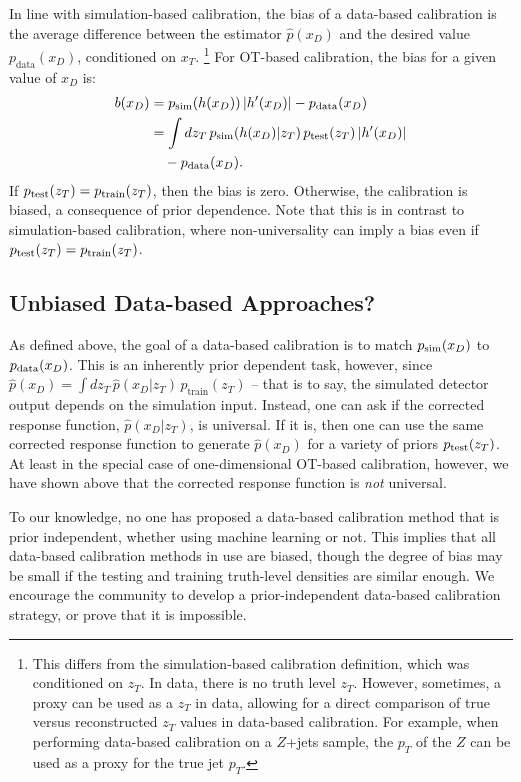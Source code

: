 \documentclass[aps,prd,reprint,preprintnumbers,superscriptaddress,nofootinbib,longbibliography,floatfix]{revtex4-1}
\begin{document}
In line with simulation-based calibration, the bias of a data-based calibration is the average difference between the estimator $\hat{p}(x_D)$ and the desired value $p_{\text{data}}(x_D)$, conditioned on $x_T$.%
%
\footnote{This differs from the simulation-based calibration definition, which was conditioned on $z_T$. In data, there is no truth level $z_T$. However, sometimes, a proxy can be used as a $z_T$ in data, allowing for a direct comparison of true versus reconstructed $z_T$ values in data-based calibration. For example, when performing data-based calibration on a $Z$+jets sample, the $p_T$ of the $Z$ can be used as a proxy for the true jet $p_T$.}
%
For OT-based calibration, the bias for a given value of $x_D$ is:
%
\begin{align}
    b(x_D) &= p_{\rm sim}(h(x_D))\,|h'(x_D)| - p_{\rm data}(x_D) \\
           &= \int dz_T\, p_{\rm sim}(h(x_D)|z_T)\,p_{\rm test}(z_T)\,|h'(x_D)| \nonumber \\ &\quad - p_{\rm data}(x_D) \nonumber.
\end{align}
%
If $p_{\rm test}(z_T) = p_{\rm train}(z_T)$, then the bias is zero. 
%
Otherwise, the calibration is biased, a consequence of prior dependence. 
%
Note that this is in contrast to simulation-based calibration, where non-universality can imply a bias even if $p_{\rm test}(z_T) = p_{\rm train}(z_T)$. 

\subsection{Unbiased Data-based Approaches?}
\label{sec:data_based_prior}

As defined above, the goal of a data-based calibration is to match $p_{\rm sim}(x_D)$ to $p_{\rm data}(x_D)$.
%
This is an inherently prior dependent task, however, since $\hat{p}(x_D) = \int dz_T\, \hat{p}(x_D|z_T)\,p_{\text{train}}(z_T)$ -- that is to say, the simulated detector output depends on the simulation input.
%
Instead, one can ask if the corrected response function, $\hat{p}(x_D|z_T)$, is universal. 
%
If it is, then one can use the same corrected response function to generate $\hat{p}(x_D)$ for a variety of priors $p_{\rm test}(z_T)$.  
%
At least in the special case of one-dimensional OT-based calibration, however, we have shown above that the corrected response function is \emph{not} universal.

To our knowledge, no one has proposed a data-based calibration method that is prior independent, whether using machine learning or not.
%
This implies that all data-based calibration methods in use are biased, though the degree of bias may be small if the testing and training truth-level densities are similar enough.
%
We encourage the community to develop a prior-independent data-based calibration strategy, or prove that it is impossible.
\end{document}

